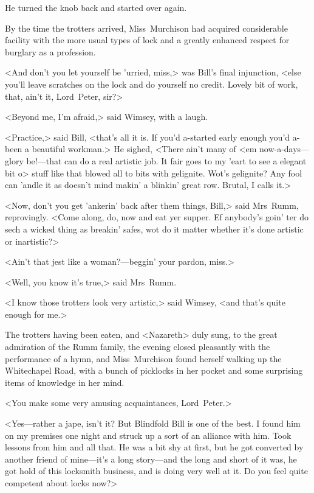 He turned the knob back and started over again.

By the time the trotters arrived, Miss~Murchison had acquired considerable facility with the more usual types of lock and a greatly enhanced respect for burglary as a profession.

<And don't you let yourself be 'urried, miss,> was Bill's final injunction, <else you'll leave scratches on the lock and do yourself no credit. Lovely bit of work, that, ain't it, Lord~Peter, sir?>

<Beyond me, I'm afraid,> said Wimsey, with a laugh.

<Practice,> said Bill, <that's all it is. If you'd a-started early enough you'd a-been a beautiful workman.> He sighed, <There ain't many of <em now-a-days—glory be!—that can do a real artistic job. It fair goes to my 'eart to see a elegant bit o> stuff like that blowed all to bits with gelignite. Wot's gelignite? Any fool can 'andle it as doesn't mind makin' a blinkin' great row. Brutal, I calls it.>

<Now, don't you get 'ankerin' back after them things, Bill,> said Mrs~Rumm, reprovingly. <Come along, do, now and eat yer supper. Ef anybody's goin' ter do sech a wicked thing as breakin' safes, wot do it matter whether it's done artistic or inartistic?>

<Ain't that jest like a woman?—beggin' your pardon, miss.>

<Well, you know it's true,> said Mrs~Rumm.

<I know those trotters look very artistic,> said Wimsey, <and that's quite enough for me.>

The trotters having been eaten, and <Nazareth> duly sung, to the great admiration of the Rumm family, the evening closed pleasantly with the performance of a hymn, and Miss~Murchison found herself walking up the Whitechapel Road, with a bunch of picklocks in her pocket and some surprising items of knowledge in her mind.

<You make some very amusing acquaintances, Lord~Peter.>

<Yes—rather a jape, isn't it? But Blindfold Bill is one of the best. I found him on my premises one night and struck up a sort of an alliance with him. Took lessons from him and all that. He was a bit shy at first, but he got converted by another friend of mine—it's a long story—and the long and short of it was, he got hold of this locksmith business, and is doing very well at it. Do you feel quite competent about locks now?>

